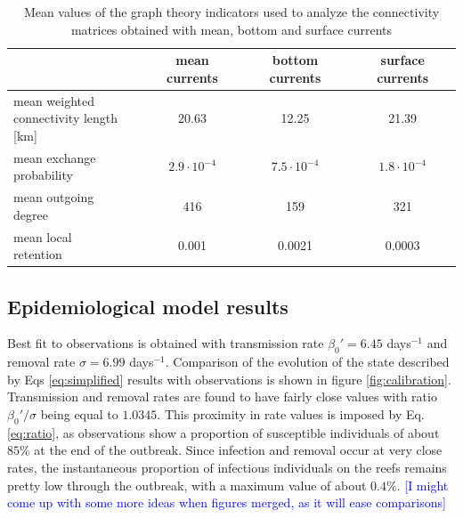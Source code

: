 \documentclass[utf8]{frontiersSCNS}
\begin{document}
\begin{table}
    \centering
    \begin{tabular}{|l|c|c|c|}
        \hline
                                   & mean currents      & bottom currents    & surface currents   \\
        \hline
        \makecell{mean weighted \\
        connectivity length [km]}  & 20.63              & 12.25              & 21.39              \\
        \hline
        \makecell{mean exchange 
        \\probability}             & $2.9\cdot 10^{-4}$ & $7.5\cdot 10^{-4}$ & $1.8\cdot 10^{-4}$ \\
        \hline
        \makecell{mean outgoing \\
        degree}                    & 416                & 159                & 321 \\
        \hline
        \makecell{mean local  \\
        retention}                 & 0.001              & 0.0021             & 0.0003 \\
        \hline
    \end{tabular}
    \caption{Mean values of the graph theory indicators used to analyze the connectivity matrices obtained with mean, bottom and surface currents}
    \label{tab:connect}
\end{table}

\subsection{Epidemiological model results}

Best fit to observations is obtained with transmission rate $\beta_0'=6.45$ days$^{-1}$ and removal rate $\sigma=6.99$ days$^{-1}$. Comparison of the evolution of the state described by Eqs \ref{eq:simplified} results with observations is shown in figure \ref{fig:calibration}. Transmission and removal rates are found to have fairly close values with ratio $\beta_0'/\sigma$ being equal to $1.0345$. This proximity in rate values is imposed by Eq. \ref{eq:ratio}, as observations show a proportion of susceptible individuals of about $85\%$ at the end of the outbreak. Since infection and removal occur at very close rates, the instantaneous proportion of infectious individuals on the reefs remains pretty low through the outbreak, with a maximum value of about $0.4\%$.
\textcolor{blue}{[I might come up with some more ideas when figures merged, as it will ease comparisons]}
\end{document}
